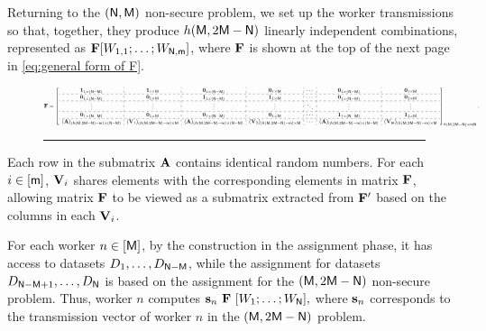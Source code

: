 \documentclass[conference,letterpaper]{IEEEtran}
\begin{document}
Returning to the \( ({\sf N}, {\sf M}) \) non-secure problem, we set up the worker transmissions so that, together, they produce \( h({\sf M}, 2{\sf M} - {\sf N}) \) linearly independent combinations, represented as \( {\bf F} [W_{1,1}; \ldots; W_{{\sf N}, {\sf m}}] \), where \( {\bf F} \) is shown at the top of the next page in \eqref{eq:general form of F}.
\begin{figure}[ht]
\begin{equation}
\resizebox{\textwidth}{!}{$ %
{\bf F} = 
\left[
\begin{array}{c:c:c:c:c:c:c}
{\bf 1}_{1 \times (\Nsf - \Msf)} & {\bf 1}_{1 \times \Msf} & {\bf 0}_{1 \times (\Nsf - \Msf)} & {\bf 0}_{1 \times \Msf} & \cdots & {\bf 0}_{1 \times (\Nsf - \Msf)} & {\bf 0}_{1 \times \Msf} \\ \hdashline
{\bf 0}_{1 \times (\Nsf - \Msf)} & {\bf 0}_{1 \times \Msf} & {\bf 1}_{1 \times (\Nsf - \Msf)} & {\bf 1}_{1 \times \Msf} & \cdots & {\bf 0}_{1 \times (\Nsf - \Msf)} & {\bf 0}_{1 \times \Msf} \\ \hdashline 
\vdots & \vdots & \vdots & \vdots & \ddots & \vdots & \vdots \\ \hdashline
{\bf 0}_{1 \times (\Nsf - \Msf)} & {\bf 0}_{1 \times \Msf} & {\bf 0}_{1 \times (\Nsf - \Msf)} & {\bf 0}_{1 \times \Msf} & \cdots & {\bf 1}_{1 \times (\Nsf - \Msf)} & {\bf 1}_{1 \times \Msf} \\ \hdashline
({\bf A})_{(h(\Msf, 2\Msf-\Nsf) - \msf) \times (\Nsf - \Msf)} & ({\bf V}_{1})_{(h(\Msf, 2\Msf-\Nsf) - \msf) \times \Msf} & ({\bf A})_{(h(\Msf, 2\Msf-\Nsf) - \msf) \times (\Nsf - \Msf)} & ({\bf V}_{2})_{(h(\Msf, 2\Msf-\Nsf) - \msf) \times \Msf} & \cdots & ({\bf A})_{(h(\Msf, 2\Msf-\Nsf) - \msf) \times (\Nsf - \Msf)} & ({\bf V}_{\msf})_{(h(\Msf, 2\Msf-\Nsf) - \msf) \times \Msf}
\end{array}
\right]_{h(\Msf, 2\Msf - \Nsf) \times \msf \Nsf}.$}
\label{eq:general form of F}
\end{equation}
\rule{\textwidth}{0.2pt} %
\end{figure}
Each row in the submatrix ${\bf A}$ contains identical random numbers. For each $i \in [{\sf m}]$, ${\bf V}_i$ shares elements with the corresponding elements in matrix ${\bf F}$, allowing matrix ${\bf F}$ to be viewed as a submatrix extracted from ${\bf F}'$ based on the columns in each ${\bf V}_i$.

For each worker $n \in [{\sf M}]$, by the construction in the assignment phase, it has access to datasets $D_1, \ldots, D_{{\sf N} - {\sf M}}$, while the assignment for datasets $D_{{\sf N} - {\sf M} + 1}, \ldots, D_{{\sf N}}$ is based on the assignment for the $({\sf M}, 2{\sf M} - {\sf N})$ non-secure problem. Thus, worker $n$ computes
$ 
{\bf s}_{n} \ {\bf F} \ [W_1; \ldots; W_{{\sf N}}],
$
where ${\bf s}_n$ corresponds to the transmission vector of worker $n$ in the $({\sf M}, 2{\sf M} - {\sf N})$ problem.
\end{document}
